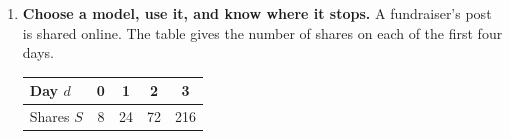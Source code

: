\begin{enumerate}[leftmargin=1.8em, itemsep=8pt, topsep=5pt]
\begin{enumerate}[label=(\alph*), leftmargin=1.8em, itemsep=4pt, topsep=4pt]
  \item Give the absolute maximum as a \textbf{value and a location}. Read the location carefully
        --- it is not a single price.
\begin{work}
   \$600 \; (P=6),  &\$7  \$10 \\
   [7,10], &
\end{work}

  \item A consultant tells the owner: ``charge as much as you can --- more money per sandwich
        means more profit.'' Use the graph to explain why that is wrong, and name the price you
        would recommend and why.

\end{enumerate}

\boxguard[26]
\item \textbf{Choose a model, use it, and know where it stops.} A fundraiser's post is shared
online. The table gives the number of shares on each of the first four days.

\vspace{3pt}
\begin{center}
\begin{tabular}{@{}l|cccc@{}}
Day $d$ & 0 & 1 & 2 & 3 \\ \hline
Shares $S$ & 8 & 24 & 72 & 216 \\
\end{tabular}
\end{center}


\end{enumerate}
